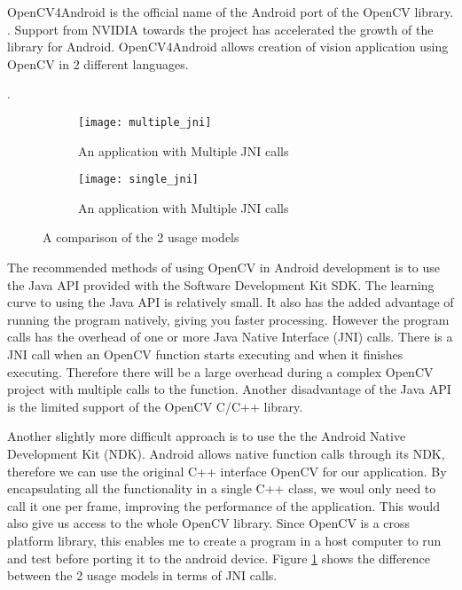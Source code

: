 OpenCV4Android is the official name of the Android port of the OpenCV library. 
\cite{opencv4android_link}. 
Support from NVIDIA towards the project has accelerated the growth of the library for Android. OpenCV4Android allows creation of vision application using OpenCV in 2  different languages.

\cite{opencv_usage_model}. 
\begin{figure}[H]
    \centering
    \begin{subfigure}[b]{0.47\textwidth}
        \centering
        \texttt{[image: multiple\_jni]}
        \caption{An application with Multiple JNI calls}
    \end{subfigure}
    \hfill
    \begin{subfigure}[b]{0.47\textwidth}
        \centering
        \texttt{[image: single\_jni]}
        \caption{An application with Multiple JNI calls}
    \end{subfigure}
    \hfill
    \caption{A comparison of the 2 usage models\cite{opencv_jni_images}}
     \label{two_usage_models}
\end{figure}

The recommended methods of using OpenCV in Android development is to use the Java API provided with the Software Development Kit SDK\cite{opencv_usage_model}. The learning curve to using the Java API is relatively small. It also has the added advantage of running the program natively, giving you faster processing. However the program calls has the overhead of  one or more Java Native Interface (JNI) calls. There is a JNI call when an OpenCV function starts executing and when it finishes executing. Therefore there will be a large overhead during a complex OpenCV project with multiple calls to the function. Another disadvantage of the Java API is the limited support of the OpenCV C/C++ library.

Another slightly more difficult approach is to use the the Android Native Development Kit (NDK). Android allows native function calls through its NDK, therefore we can use the original C++ interface OpenCV for our application. By encapsulating all the functionality in a single C++ class, we woul only need to call it one per frame, improving the performance of the application. This would also give us access to the whole OpenCV library. Since OpenCV is a cross platform library, this enables me to create a program in a host computer to run and test before porting it to the android device. Figure \ref{two_usage_models} shows the difference between the 2 usage models in terms of JNI calls. 

